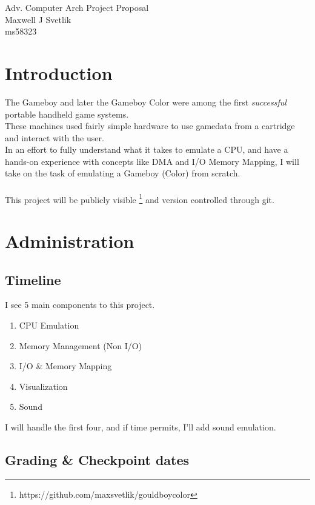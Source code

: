 \documentclass{article}
\begin{document}
\begingroup
    \centering
    \LARGE Adv. Computer Arch Project Proposal \\
    \large Maxwell J Svetlik \\
    \large ms58323 \\
\endgroup

\section{Introduction} 
The Gameboy and later the Gameboy Color were among the first \textit{successful} portable handheld game systems. \\ 
These machines used fairly simple hardware to use gamedata from a cartridge and interact with the user. \\
In an effort to fully understand what it takes to emulate a CPU, and have a hands-on experience with concepts 
like DMA and I/O Memory Mapping, I will take on the task of emulating a Gameboy (Color) from scratch. \\
\\
This project will be publicly visible \footnote{https://github.com/maxsvetlik/gouldboycolor}
and version controlled through git.

\section{Administration}
    \subsection{Timeline}
        I see 5 main components to this project.\\
        \begin{enumerate}
            \item CPU Emulation
            \item Memory Management (Non I/O) 
            \item I/O \& Memory Mapping 
            \item Visualization 
            \item Sound 
        \end{enumerate}
        
        I will handle the first four, and if time permits, I'll add sound emulation.

        \subsection{Grading \& Checkpoint dates}
\end{document}
